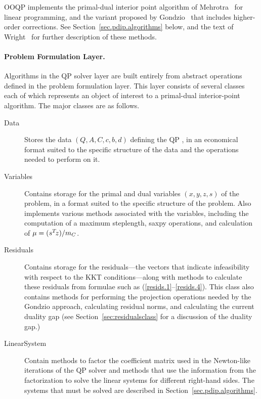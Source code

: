 OOQP implements the primal-dual interior point algorithm of
Mehrotra~\cite{Meh92b} for linear programming, and the variant
proposed by Gondzio~\cite{Gon94d} that includes higher-order
corrections.  See Section~\ref{sec.pdip.algorithms} below, and the
text of Wright~\cite{IPPD96} for further description of these methods.

\paragraph{Problem Formulation Layer.}

Algorithms in the QP solver layer are built entirely from abstract
operations defined in the problem formulation layer. This layer
consists of several classes each of which represents an object of
interest to a primal-dual interior-point algorithm. The major classes
are as follows.
\begin{description}
  
\item[Data] Stores the data $(Q, A, C, c, b, d)$ defining the QP
, in an economical format suited to the specific
structure of the data and the operations needed to perform on it.
  
\item[Variables] Contains storage for the primal and dual variables
$(x, y, z, s)$ of the problem, in a format suited to the specific
structure of the problem.  Also implements various methods associated
with the variables, including the computation of a maximum steplength,
saxpy operations, and calculation of $\mu = (s^T\! z)/m_{C}$.
  
\item[Residuals] Contains storage for the residuals---the vectors that
indicate infeasibility with respect to the KKT conditions---along with
methods to calculate these residuals from formulae such as
(\ref{resids.1}--\ref{resids.4}).  This class also contains methods for
performing the projection operations needed by the Gondzio approach,
calculating residual norms, and calculating the current duality gap
(see Section~\ref{sec:residualsclass} for a discussion of the duality
gap.)
  
\item[LinearSystem] Contain methods to factor the coefficient matrix
used in the Newton-like iterations of the QP solver and methods that
use the information from the factorization to solve the linear systems
for different right-hand sides. The systems that must be solved are
described in Section~\ref{sec.pdip.algorithms}.

\end{description}

